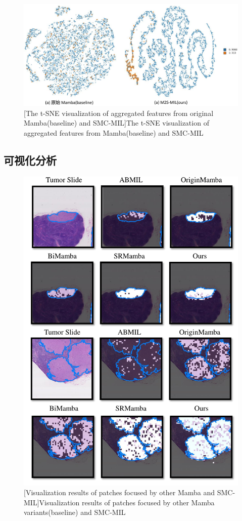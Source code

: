 \begin{figure}[ht]
  \centering
  \includegraphics[width=1.0\columnwidth]{figures/vis2_2.pdf}
  [The t-SNE visualization of aggregated features from original Mamba(baseline) and SMC-MIL]{The t-SNE visualization of aggregated features from Mamba(baseline) and SMC-MIL}
  \label{figure3: tSNE}
\end{figure}

\subsection[\hspace{-2pt}可视化分析]{{\heiti{} \hspace{-8pt}可视化分析}}\label{section3: 可视化分析}
\begin{figure}[h!]
  \centering
  \includegraphics[width=0.7\columnwidth]{figures/vis2.pdf}
  [Visualization results of patches focused by other Mamba and SMC-MIL]{Visualization results of patches focused by other Mamba variants(baseline) and SMC-MIL}
  \label{figure3: visualize}
\end{figure}

